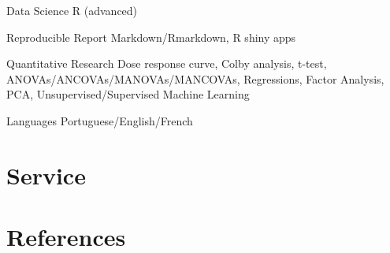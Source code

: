 \documentclass[11pt, a4paper]{awesome-cv}
\begin{document}
\begin{cvskills}
  \cvskill
    {Data Science}
    {R (advanced)}

  \cvskill
    {Reproducible Report}
    {Markdown/Rmarkdown, R shiny apps}

  \cvskill
    {Quantitative Research}
    {Dose response curve, Colby analysis, t-test, ANOVAs/ANCOVAs/MANOVAs/MANCOVAs,\newline
    Regressions, Factor Analysis, PCA, Unsupervised/Supervised Machine Learning}

  \cvskill
    {Languages}
    {Portuguese/English/French}
\end{cvskills}

\hypertarget{service}{%
\section{Service}\label{service}}

\begin{cventries}
\end{cventries}

\hypertarget{references}{%
\section{References}\label{references}}
\end{document}
